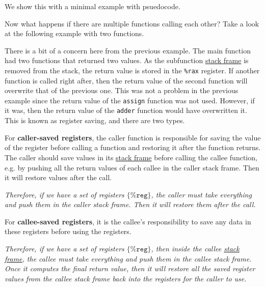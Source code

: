   \begin{example}
    \label{ex:control-transfer-example}
    We show this with a minimal example with psuedocode. 
  \end{example}

  \begin{example}
    \label{ex:multiple-functions-example}
    Now what happens if there are multiple functions calling each other? Take a look at the following example with two functions. 
  \end{example}

  There is a bit of a concern here from the previous example. The main function had two functions that returned two values. As the subfunction \hyperref[def:stack-frame]{stack frame} is removed from the stack, the return value is stored in the \texttt{\%rax} register. If another function is called right after, then the return value of the second function will overwrite that of the previous one. This was not a problem in the previous example since the return value of the \texttt{assign} function was not used. However, if it was, then the return value of the \texttt{adder} function would have overwritten it. This is known as register saving, and there are two types. 

  \begin{definition}
    \label{def:caller-saved-registers}
    For \textbf{caller-saved registers}, the caller function is responsible for saving the value of the register before calling a function and restoring it after the function returns. The caller should save values in its \hyperref[def:stack-frame]{stack frame} before calling the callee function, e.g. by pushing all the return values of each callee in the caller stack frame. Then it will restore values after the call. 

    \begin{center}
      \textit{Therefore, if we have a set of registers $\{\texttt{\%reg}\}$, the caller must take everything and push them in the caller stack frame. Then it will restore them after the call.}
    \end{center}
  \end{definition}

  \begin{definition}
    \label{def:callee-saved-registers}
    For \textbf{callee-saved registers}, it is the callee's responsibility to save any data in these registers before using the registers. 

    \begin{center} 
      \textit{Therefore, if we have a set of registers $\{\texttt{\%reg}\}$, then inside the callee \hyperref[def:stack-frame]{stack frame}, the callee must take everything and push them in the callee stack frame. Once it computes the final return value, then it will restore all the saved register values from the callee stack frame back into the registers for the caller to use.}
    \end{center}
  \end{definition}

